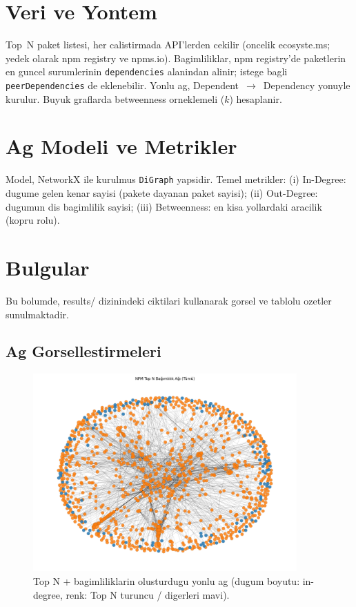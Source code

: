\documentclass[11pt,a4paper]{article}
\begin{document}
\section{Veri ve Yontem}
Top~N paket listesi, her calistirmada API'lerden cekilir (oncelik ecosyste.ms; yedek olarak npm registry ve npms.io). Bagimliliklar, npm registry'de paketlerin en guncel surumlerinin \texttt{dependencies} alanindan alinir; istege bagli \texttt{peerDependencies} de eklenebilir. Yonlu ag, Dependent~$\to$~Dependency yonuyle kurulur. Buyuk graflarda betweenness orneklemeli ($k$) hesaplanir.

\section{Ag Modeli ve Metrikler}
Model, NetworkX ile kurulmus \texttt{DiGraph} yapsidir. Temel metrikler: (i) In-Degree: dugume gelen kenar sayisi (pakete dayanan paket sayisi); (ii) Out-Degree: dugumun dis bagimlilik sayisi; (iii) Betweenness: en kisa yollardaki aracilik (kopru rolu).

\section{Bulgular}
Bu bolumde, results/ dizinindeki ciktilari kullanarak gorsel ve tablolu ozetler sunulmaktadir.

\subsection{Ag Gorsellestirmeleri}
\begin{figure}[h]
  \centering
  \includegraphics[width=0.90\textwidth]{network_full_topN.png}
  \caption{Top N + bagimliliklarin olusturdugu yonlu ag (dugum boyutu: in-degree, renk: Top N turuncu / digerleri mavi).}
\end{figure}
\end{document}
